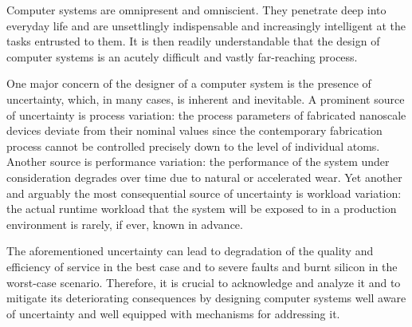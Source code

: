 Computer systems are omnipresent and omniscient. They penetrate deep into
everyday life and are unsettlingly indispensable and increasingly intelligent at
the tasks entrusted to them. It is then readily understandable that the design
of computer systems is an acutely difficult and vastly far-reaching process.

One major concern of the designer of a computer system is the presence of
uncertainty, which, in many cases, is inherent and inevitable. A prominent
source of uncertainty is process variation: the process parameters of fabricated
nanoscale devices deviate from their nominal values since the contemporary
fabrication process cannot be controlled precisely down to the level of
individual atoms. Another source is performance variation: the performance of
the system under consideration degrades over time due to natural or accelerated
wear. Yet another and arguably the most consequential source of uncertainty is
workload variation: the actual runtime workload that the system will be exposed
to in a production environment is rarely, if ever, known in advance.

The aforementioned uncertainty can lead to degradation of the quality and
efficiency of service in the best case and to severe faults and burnt silicon in
the worst-case scenario. Therefore, it is crucial to acknowledge and analyze it
and to mitigate its deteriorating consequences by designing computer systems
well aware of uncertainty and well equipped with mechanisms for addressing it.
